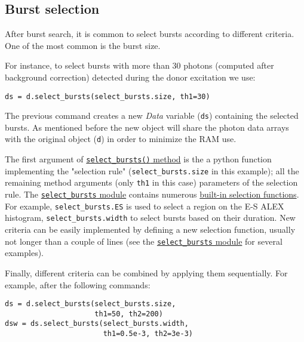 \subsection{Burst selection}
\label{sec:burstsel}

After burst search, it is common to select bursts according to different
criteria. One of the most common is the burst size.

For instance, to select bursts with more than 30 photons (computed
after background correction) detected during the donor excitation
we use:

\begin{verbatim}
ds = d.select_bursts(select_bursts.size, th1=30)
\end{verbatim}

The previous command creates a new \textit{Data} variable (\verb|ds|) containing
the selected bursts.
As mentioned before the new object will share the photon data
arrays with the original object (\verb|d|) in order to minimize the RAM use.

The first argument of 
\href{http://fretbursts.readthedocs.org/en/latest/data_class.html#burst-selection-methods}{\texttt{select\_bursts()} method}
is the a python function implementing the "selection rule" (\verb|select_bursts.size| in this example);
all the remaining method arguments (only \verb|th1| in this case) parameters of the selection rule.
The \href{http://fretbursts.readthedocs.org/en/latest/burst_selection.html}{\texttt{select\_bursts} module}
contains numerous
\href{http://fretbursts.readthedocs.org/en/latest/burst_selection.html#module-fretbursts.select_bursts}{built-in selection functions}.
For example,
\verb|select_bursts.ES|
is used to select a region on the E-S ALEX histogram,
\verb|select_bursts.width|
to select bursts based on their duration.
New criteria can be easily implemented by defining a new selection function,
usually not longer than a couple of lines (see the
\href{https://github.com/tritemio/FRETBursts/blob/master/fretbursts/select\_bursts.py}{\texttt{select\_bursts} module} for several examples).

Finally, different criteria can be combined by applying them sequentially.
For example, after the following commands:

\begin{verbatim}
ds = d.select_bursts(select_bursts.size,
                     th1=50, th2=200)
dsw = ds.select_bursts(select_bursts.width,
                       th1=0.5e-3, th2=3e-3)
\end{verbatim}

